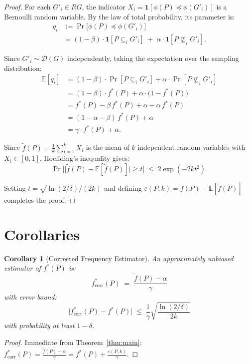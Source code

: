 \documentclass[11pt,a4paper]{article}
\theoremstyle{plain}
\newtheorem{corollary}[theorem]{Corollary}
\theoremstyle{definition}
\newcommand{\freq}{\tilde{f}}
\newcommand{\fstar}{f^*}
\begin{document}
\begin{proof}
For each $G'_i \in RG$, the indicator $X_i = \mathbf{1}[\phi(P) \preceq \phi(G'_i)]$ is a Bernoulli random variable. By the law of total probability, its parameter is:
\begin{align*}
q_i &:= \Pr\!\big[\phi(P) \preceq \phi(G'_i)\big] \\
    &= (1-\beta)\cdot\mathbf{1}[P \subseteq_i G'_i] \;+\; \alpha\cdot\mathbf{1}[P \not\subseteq_i G'_i].
\end{align*}

Since $G'_i \sim \mathcal{D}(G)$ independently, taking the expectation over the sampling distribution:
\begin{align*}
\mathbb{E}[q_i] &= (1-\beta)\cdot\Pr[P \subseteq_i G'_i] + \alpha\cdot\Pr[P \not\subseteq_i G'_i] \\
                 &= (1-\beta)\cdot \fstar(P) + \alpha\cdot\big(1 - \fstar(P)\big) \\
                 &= \fstar(P) - \beta\,\fstar(P) + \alpha - \alpha\,\fstar(P) \\
                 &= (1 - \alpha - \beta)\,\fstar(P) + \alpha \\
                 &= \gamma\cdot \fstar(P) + \alpha.
\end{align*}

Since $\freq(P) = \frac{1}{k}\sum_{i=1}^{k} X_i$ is the mean of $k$ independent random variables with $X_i \in [0,1]$, Hoeffding's inequality gives:
\[
\Pr\!\Big[\big|\freq(P) - \mathbb{E}[\freq(P)]\big| \geq t\Big] \;\leq\; 2\exp(-2kt^2).
\]

Setting $t = \sqrt{\ln(2/\delta)/(2k)}$ and defining $\varepsilon(P,k) = \freq(P) - \mathbb{E}[\freq(P)]$ completes the proof.
\end{proof}

\section{Corollaries}

\begin{corollary}[Corrected Frequency Estimator]\label{cor:corrected}
An approximately unbiased estimator of $\fstar(P)$ is:
\[
\fstar_{\mathrm{corr}}(P) \;=\; \frac{\freq(P) - \alpha}{\gamma}
\]
with error bound:
\[
\big|\fstar_{\mathrm{corr}}(P) - \fstar(P)\big| \;\leq\; \frac{1}{\gamma}\sqrt{\frac{\ln(2/\delta)}{2k}}
\]
with probability at least $1 - \delta$.
\end{corollary}

\begin{proof}
Immediate from Theorem~\ref{thm:main}: $\fstar_{\mathrm{corr}}(P) = \frac{\freq(P) - \alpha}{\gamma} = \fstar(P) + \frac{\varepsilon(P,k)}{\gamma}$.
\end{proof}
\end{document}
